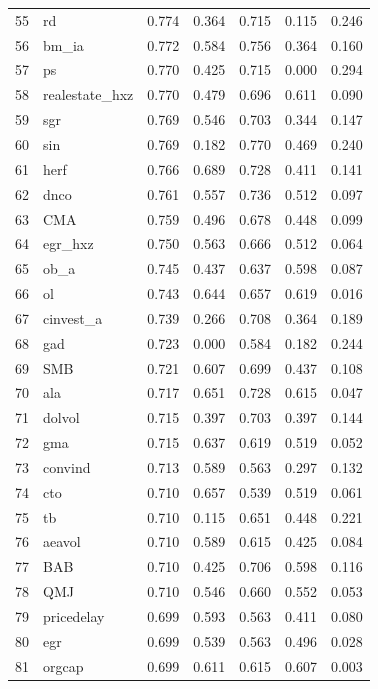 \begin{footnotesize}
\begin{longtable}{rl|c|c|c|c|c}
  55 & rd & 0.774 & 0.364 & 0.715 & 0.115 & 0.246 \\ 
  56 & bm\_ia & 0.772 & 0.584 & 0.756 & 0.364 & 0.160 \\ 
  57 & ps & 0.770 & 0.425 & 0.715 & 0.000 & 0.294 \\ 
  58 & realestate\_hxz & 0.770 & 0.479 & 0.696 & 0.611 & 0.090 \\ 
  59 & sgr & 0.769 & 0.546 & 0.703 & 0.344 & 0.147 \\ 
  60 & sin & 0.769 & 0.182 & 0.770 & 0.469 & 0.240 \\ 
  61 & herf & 0.766 & 0.689 & 0.728 & 0.411 & 0.141 \\ 
  62 & dnco & 0.761 & 0.557 & 0.736 & 0.512 & 0.097 \\ 
  63 & CMA & 0.759 & 0.496 & 0.678 & 0.448 & 0.099 \\ 
  64 & egr\_hxz & 0.750 & 0.563 & 0.666 & 0.512 & 0.064 \\ 
  65 & ob\_a & 0.745 & 0.437 & 0.637 & 0.598 & 0.087 \\ 
  66 & ol & 0.743 & 0.644 & 0.657 & 0.619 & 0.016 \\ 
  67 & cinvest\_a & 0.739 & 0.266 & 0.708 & 0.364 & 0.189 \\ 
  68 & gad & 0.723 & 0.000 & 0.584 & 0.182 & 0.244 \\ 
  69 & SMB & 0.721 & 0.607 & 0.699 & 0.437 & 0.108 \\ 
  70 & ala & 0.717 & 0.651 & 0.728 & 0.615 & 0.047 \\ 
  71 & dolvol & 0.715 & 0.397 & 0.703 & 0.397 & 0.144 \\ 
  72 & gma & 0.715 & 0.637 & 0.619 & 0.519 & 0.052 \\ 
  73 & convind & 0.713 & 0.589 & 0.563 & 0.297 & 0.132 \\ 
  74 & cto & 0.710 & 0.657 & 0.539 & 0.519 & 0.061 \\ 
  75 & tb & 0.710 & 0.115 & 0.651 & 0.448 & 0.221 \\ 
  76 & aeavol & 0.710 & 0.589 & 0.615 & 0.425 & 0.084 \\ 
  77 & BAB & 0.710 & 0.425 & 0.706 & 0.598 & 0.116 \\ 
  78 & QMJ & 0.710 & 0.546 & 0.660 & 0.552 & 0.053 \\ 
  79 & pricedelay & 0.699 & 0.593 & 0.563 & 0.411 & 0.080 \\ 
  80 & egr & 0.699 & 0.539 & 0.563 & 0.496 & 0.028 \\ 
  81 & orgcap & 0.699 & 0.611 & 0.615 & 0.607 & 0.003 \\ 

\end{longtable}
\end{footnotesize}

